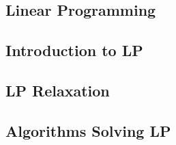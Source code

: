 \documentclass[12pt,oneside]{book} %
\begin{document}
\begin{spacing}{1}



\chapter{Linear Programming}
\section{Introduction to LP}

\section{LP Relaxation}


\section{Algorithms Solving LP}







% 


% 

% 

% 




\end{spacing}
\end{document}
